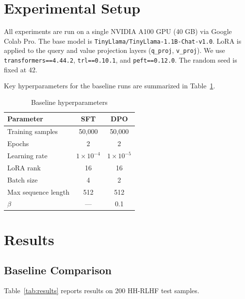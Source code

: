 \documentclass{llncs}
\begin{document}
\section{Experimental Setup}

All experiments are run on a single NVIDIA A100 GPU (40 GB) via Google Colab Pro. The base model
is \texttt{TinyLlama/TinyLlama-1.1B-Chat-v1.0}. LoRA is applied to the query and value
projection layers (\texttt{q\_proj}, \texttt{v\_proj}). We use \texttt{transformers==4.44.2}, \texttt{trl==0.10.1}, and
\texttt{peft==0.12.0}. The random seed is fixed at 42.

Key hyperparameters for the baseline runs are summarized in Table~\ref{tab:hparams}.

\begin{table}[t]
\centering
\caption{Baseline hyperparameters}
\label{tab:hparams}
\begin{tabular}{lcc}
\toprule
\textbf{Parameter} & \textbf{SFT} & \textbf{DPO} \\
\midrule
Training samples   & 50,000       & 50,000       \\
Epochs             & 2            & 2            \\
Learning rate      & $1\times10^{-4}$ & $1\times10^{-5}$ \\
LoRA rank          & 16           & 16           \\
Batch size         & 4            & 2            \\
Max sequence length & 512         & 512          \\
$\beta$            & ---          & 0.1          \\
\bottomrule
\end{tabular}
\end{table}

\section{Results}

\subsection{Baseline Comparison}

Table~\ref{tab:results} reports results on 200 HH-RLHF test samples.
\end{document}
